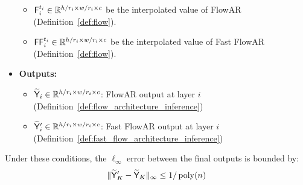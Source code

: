 \begin{lemma}
\begin{itemize}
\begin{itemize}
            \item $\mathsf{F}_i^{t_i} \in \mathbb{R}^{h/r_i \times w/r_i \times c}$ be the interpolated value of FlowAR (Definition~\ref{def:flow}).
            \item $\mathsf{FF}_i^{t_i} \in \mathbb{R}^{h/r_i \times w/r_i \times c}$ be the interpolated value of Fast FlowAR (Definition~\ref{def:flow}).
        \end{itemize} 
        \item {\bf Outputs:}
        \begin{itemize}
            \item $\widetilde{\mathsf{Y}}_i \in \mathbb{R}^{h/r_i \times w/r_i \times c}$: FlowAR output at layer $i$ (Definition~\ref{def:flow_architecture_inference})
            \item $\widetilde{\mathsf{Y}}'_i \in \mathbb{R}^{h/r_i \times w/r_i \times c}$: Fast FlowAR output at layer $i$ (Definition~\ref{def:fast_flow_architecture_inference})
        \end{itemize}
    \end{itemize}
    Under these conditions, the $\ell_\infty$ error between the final outputs is bounded by:
    \begin{align*}
        \|\widetilde{\mathsf{Y}}'_K - \widetilde{\mathsf{Y}}_K\|_\infty \leq 1/\operatorname{poly}(n)
    \end{align*}
    
\end{lemma}
